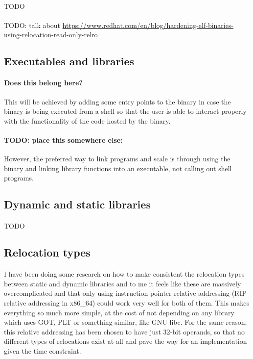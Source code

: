 \documentclass[12pt]{article}
\begin{document}
	\paragraph{}TODO
	
	\paragraph{}TODO: talk about \href{https://www.redhat.com/en/blog/hardening-elf-binaries-using-relocation-read-only-relro}{https://www.redhat.com/en/blog/hardening-elf-binaries-using-relocation-read-only-relro}
	
	\subsection{Executables and libraries}
	
	\paragraph{Does this belong here?} This will be achieved by adding some entry points to the binary in case the binary is being executed from a shell so that the user is able to interact properly with the functionality of the code hosted by the binary.
	
	\paragraph{TODO: place this somewhere else:}However, the preferred way to link programs and scale is through using the binary and linking library functions into an executable, not calling out shell programs.
	
	\subsection{Dynamic and static libraries}
	
	\paragraph{}TODO
	
	\subsection{Relocation types}
	
	\paragraph{}I have been doing some research on how to make consistent the relocation types between static and dynamic libraries and to me it feels like these are massively overcomplicated and that only using instruction pointer relative addressing (RIP-relative addressing in x86\_64) could work very well for both of them. This makes everything so much more simple, at the cost of not depending on any library which uses GOT, PLT or something similar, like GNU libc. For the same reason, this relative addressing has been chosen to have just 32-bit operands, so that no different types of relocations exist at all and pave the way for an implementation given the time constraint.
	
\end{document}
